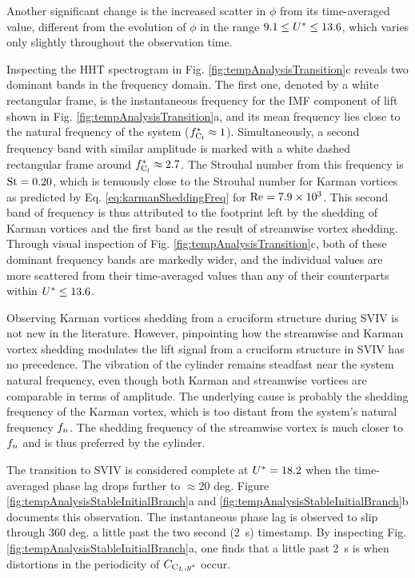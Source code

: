 \documentclass[oneside]{utmthesis}
\begin{document}
Another significant change is the increased scatter in $\phi$ from its time-averaged value, different from the evolution of $\phi$ in the range $9.1 \leq U^{*} \leq 13.6$, which varies only slightly throughout the observation time.

Inspecting the HHT spectrogram in Fig. \ref{fig:tempAnalysisTransition}c reveals two dominant bands in the frequency domain. The first one, denoted by a white rectangular frame, is the instantaneous frequency for the IMF component of lift shown in Fig. \ref{fig:tempAnalysisTransition}a, and its mean frequency lies close to the natural frequency of the system ($f_{\text{C}_{l}}^{*} \approx 1$). Simultaneously, a second frequency band with similar amplitude is marked with a white dashed rectangular frame around $f_{\text{C}_{l}}^{*} \approx 2.7$. The Strouhal number from this frequency is $\text{St} = 0.20$, which is tenuously close to the Strouhal number for Karman vortices as predicted by Eq. \ref{eq:karmanSheddingFreq} for $\text{Re} = 7.9 \times 10^{3}$. This second band of frequency is thus attributed to the footprint left by the shedding of Karman vortices and the first band as the result of streamwise vortex shedding. Through visual inspection of Fig. \ref{fig:tempAnalysisTransition}c, both of these dominant frequency bands are markedly wider, and the individual values are more scattered from their time-averaged values than any of their counterparts within $U^{*} \leq 13.6$.

Observing Karman vortices shedding from a cruciform structure during SVIV is not new in the literature. However, pinpointing how the streamwise and Karman vortex shedding modulates the lift signal from a cruciform structure in SVIV has no precedence. The vibration of the cylinder remains steadfast near the system natural frequency, even though both Karman and streamwise vortices are comparable in terms of amplitude. The underlying cause is probably the shedding frequency of the Karman vortex, which is too distant from the system's natural frequency $f_{n}$. The shedding frequency of the streamwise vortex is much closer to $f_{n}$ and is thus preferred by the cylinder.

The transition to SVIV is considered complete at $U^{*} = 18.2$ when the time-averaged phase lag drops further to $\approx 20$ deg. Figure \ref{fig:tempAnalysisStableInitialBranch}a and \ref{fig:tempAnalysisStableInitialBranch}b documents this observation. The instantaneous phase lag is observed to slip through 360 deg. a little past the two second (\SI{2}{\second}) timestamp. By inspecting Fig. \ref{fig:tempAnalysisStableInitialBranch}a, one finds that a little past \SI{2}{\second} is when distortions in the periodicity of $C_{\text{C}_{L},y^{*}}$ occur.
\end{document}

